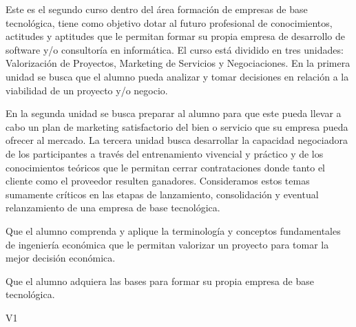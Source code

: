 \begin{syllabus}


\begin{justification}
Este es el segundo curso dentro del área formación de empresas de base tecnológica, tiene como objetivo dotar al futuro profesional de conocimientos, actitudes y aptitudes que le permitan formar su propia empresa de desarrollo de software y/o consultoría en informática. El curso está dividido en tres unidades: Valorización de Proyectos, Marketing de Servicios y Negociaciones. En la primera unidad se busca que el alumno pueda analizar y tomar decisiones en relación a la viabilidad de un proyecto y/o negocio.

En la segunda unidad se busca preparar al alumno para que este pueda llevar a cabo un plan de marketing satisfactorio del bien o servicio que su empresa pueda ofrecer al mercado. La tercera unidad busca desarrollar la capacidad negociadora de los participantes a través del entrenamiento vivencial y práctico y de los conocimientos teóricos que le permitan cerrar contrataciones donde tanto el cliente como el proveedor resulten ganadores. Consideramos estos temas sumamente críticos en las etapas de lanzamiento, consolidación y eventual relanzamiento de una empresa de base tecnológica.
\end{justification}

\begin{goals}
\item Que el alumno comprenda y aplique la terminología y conceptos fundamentales de ingeniería económica que le permitan valorizar un proyecto para tomar la mejor decisión económica.
\item Que el alumno adquiera las bases para formar su propia empresa de base tecnológica.
\end{goals}

\begin{outcomes}{V1}
\end{outcomes}


\end{syllabus}
